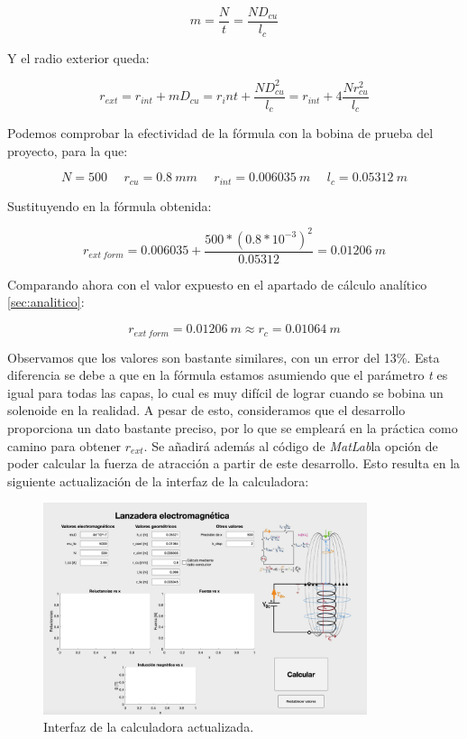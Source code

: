 \[m=\frac{N}{t}=\frac{ND_{cu}}{l_c}\]

Y el radio exterior queda:

\[r_{ext}=r_{int}+mD_{cu}=r_int+\frac{ND_{cu}^2}{l_c}=r_{int}+4\frac{Nr_{cu}^2}{l_c}\]

Podemos comprobar la efectividad de la fórmula con la bobina de prueba del proyecto, para la que:

\[N=500~~~~~~r_{cu}=0.8~mm~~~~~~r_{int}=0.006035~m~~~~~~l_c=0.05312~m\]

Sustituyendo en la fórmula obtenida:

\[r_{ext~form}=0.006035+\frac{500*(0.8*10^{-3})^2}{0.05312}=0.01206~m\]

Comparando ahora con el valor expuesto en el apartado de cálculo analítico \ref{sec:analitico}:

\[r_{ext~form}=0.01206~m\approx r_{c}=0.01064~m\]

Observamos que los valores son bastante similares, con un error del 13\%. Esta diferencia se debe a que en la fórmula estamos asumiendo que el parámetro \textit{t} es igual para todas las capas, lo cual es muy difícil de lograr cuando se bobina un solenoide en la realidad. A pesar de esto, consideramos que el desarrollo proporciona un dato bastante preciso, por lo que se empleará en la práctica como camino para obtener \(r_{ext}\). Se añadirá además al código de \textit{MatLab}\textregistered  la opción de poder calcular la fuerza de atracción a partir de este desarrollo. Esto resulta en la siguiente actualización de la interfaz de la calculadora:

\begin{figure}[H]
    \centering
    \includegraphics[width=9.5cm]{FigurasMemoria/calculadoraDef.png}
    \caption{Interfaz de la calculadora actualizada.}
    \label{fig:calculadoraDef} %
\end{figure}